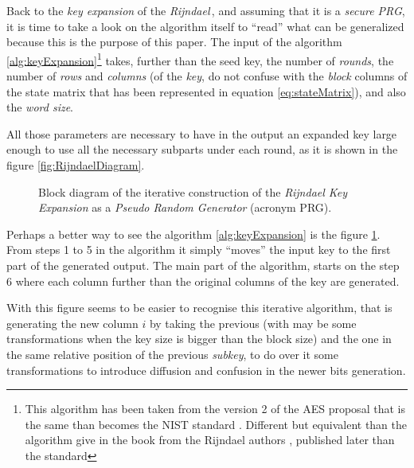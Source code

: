 \documentclass[10pt,a4paper,twoside]{llncs}
\newcommand{\fixme}[1]{\texttt{\color{red}FIXME:} ``\emph{#1}''}
\newcommand{\rijndael}{\emph{Rijndael}}
\begin{document}
Back to the \emph{key expansion} of the \rijndael\,, and assuming that it is a \emph{secure PRG}, it is time to take a look on the algorithm itself to ``read'' what can be generalized because this is the purpose of this paper. The input of the algorithm \ref{alg:keyExpansion}\footnote{This algorithm has been taken from the version 2 of the AES proposal \cite{Daemen01aes-ammended} that is the same than becomes the NIST standard \cite{AES-FIPS}. Different but equivalent than the algorithm give in the book from the Rijndael authors \cite{Daemen:2002:DR:560131}, published later than the standard} takes, further than the seed key, the number of \emph{rounds}, the number of \emph{rows} and \emph{columns} (of the \emph{key}, do not confuse with the \emph{block} columns of the state matrix that has been represented in equation \ref{eq:stateMatrix}), and also the \emph{word size}.

All those parameters are necessary to have in the output an expanded key large enough to use all the necessary subparts under each round, as it is shown in the figure \ref{fig:RijndaelDiagram}.

\begin{figure}[ht]
\begin{center}

\caption{Block diagram of the iterative construction of the \emph{Rijndael Key Expansion} as a \emph{Pseudo Random Generator} (acronym PRG). }%
\label{fig:keyExpansionDiagram}
\end{center}
\end{figure}

Perhaps a better way to see the algorithm \ref{alg:keyExpansion} is the figure \ref{fig:keyExpansionDiagram}. From steps 1 to 5 in the algorithm it simply ``moves'' the input key to the first part of the generated output. The main part of the algorithm, starts on the step 6 where each column further than the original columns of the key are generated.

With this figure seems to be easier to recognise this iterative algorithm, that is generating the new column $i$ by taking the previous (with may be some transformations when the key size is bigger than the block size) and the one in the same relative position of the previous \emph{subkey}, to do over it some transformations to introduce diffusion and confusion in the newer bits generation.
\end{document}
